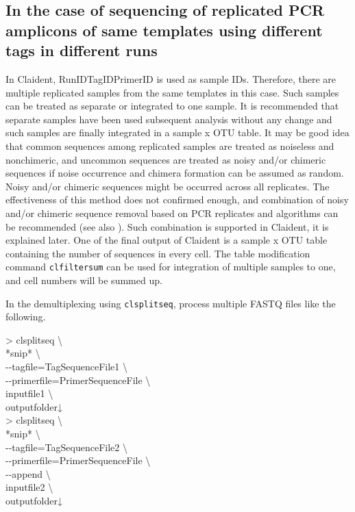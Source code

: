 \documentclass[titlepage,10pt,a4paper,english]{jsbook}
\newenvironment{cmd}{\begin{oframed}\raggedright\ttfamily\footnotesize\setlength{\baselineskip}{1.4em}}{\end{oframed}\vspace{-1em}}
\begin{document}
\subsection{In the case of sequencing of replicated PCR amplicons of same templates using different tags in different runs}

In Claident, RunID{\textunderscore}{\textunderscore}TagID{\textunderscore}{\textunderscore}PrimerID is used as sample IDs.
Therefore, there are multiple replicated samples from the same templates in this case.
Such samples can be treated as separate or integrated to one sample.
It is recommended that separate samples have been used subsequent analysis without any change and such samples are finally integrated in a sample x OTU table.
It may be good idea that common sequences among replicated samples are treated as noiseless and nonchimeric, and uncommon sequences are treated as noisy and/or chimeric sequences if noise occurrence and chimera formation can be assumed as random.
Noisy and/or chimeric sequences might be occurred across all replicates.
The effectiveness of this method does not confirmed enough, and combination of noisy and/or chimeric sequence removal based on PCR replicates and algorithms can be recommended (see also \citet{Lange2015}).
Such combination is supported in Claident, it is explained later.
One of the final output of Claident is a sample x OTU table containing the number of sequences in every cell.
The table modification command \texttt{clfiltersum} can be used for integration of multiple samples to one, and cell numbers will be summed up.

In the demultiplexing using \texttt{clsplitseq}, process multiple FASTQ files like the following.

\begin{cmd}
{\textgreater} clsplitseq {\textbackslash}\\
*snip* {\textbackslash}\\
{-}{-}tagfile=TagSequenceFile1 {\textbackslash}\\
{-}{-}primerfile=PrimerSequenceFile {\textbackslash}\\
inputfile1 {\textbackslash}\\
outputfolder↓\\
{\textgreater} clsplitseq {\textbackslash}\\
*snip* {\textbackslash}\\
{-}{-}tagfile=TagSequenceFile2 {\textbackslash}\\
{-}{-}primerfile=PrimerSequenceFile {\textbackslash}\\
{-}{-}append {\textbackslash}\\
inputfile2 {\textbackslash}\\
outputfolder↓
\end{cmd}
\end{document}
